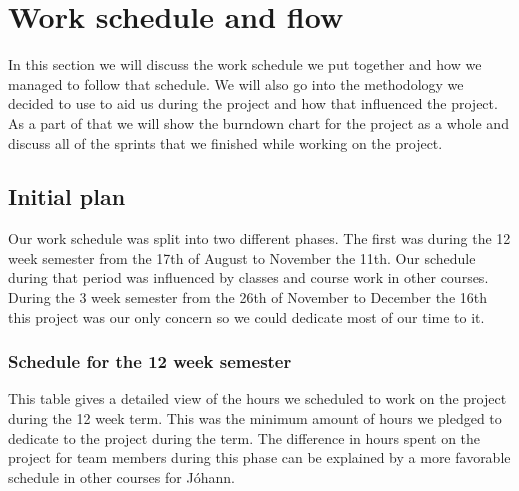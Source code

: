 \section{Work schedule and flow}\label{sec:workscheduleandflow}

In this section we will discuss the work schedule we put together and how we managed to follow that schedule. We will also go into the methodology we decided to use to aid us during the project and how that influenced the project. As a part of that we will show the burndown chart for the project as a whole and discuss all of the sprints that we finished while working on the project.

\subsection{Initial plan}

Our work schedule was split into two different phases. The first was during the 12 week semester from the 17th of August to November the 11th. Our schedule during that period was influenced by classes and course work in other courses. During the 3 week semester from the 26th of November to December the 16th this project was our only concern so we could dedicate most of our time to it. 

\subsubsection{Schedule for the 12 week semester}
  This table gives a detailed view of the hours we scheduled to work on the project during the 12 week term. This was the minimum amount of hours we pledged to dedicate to the project during the term. The difference in hours spent on the project for team members during this phase can be explained by a more favorable schedule in other courses for Jóhann. 

  \noindent

